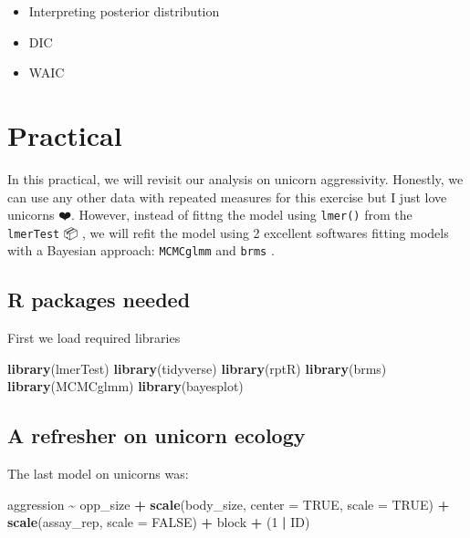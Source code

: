 \documentclass[
  12pt,
]{book}
\newenvironment{Shaded}{\begin{snugshade}}{\end{snugshade}}
\newcommand{\DataTypeTok}[1]{\textcolor[rgb]{0.13,0.29,0.53}{#1}}
\newcommand{\DecValTok}[1]{\textcolor[rgb]{0.00,0.00,0.81}{#1}}
\newcommand{\KeywordTok}[1]{\textcolor[rgb]{0.13,0.29,0.53}{\textbf{#1}}}
\newcommand{\NormalTok}[1]{#1}
\newcommand{\OperatorTok}[1]{\textcolor[rgb]{0.81,0.36,0.00}{\textbf{#1}}}
\newcommand{\OtherTok}[1]{\textcolor[rgb]{0.56,0.35,0.01}{#1}}
\newcommand{\StringTok}[1]{\textcolor[rgb]{0.31,0.60,0.02}{#1}}
\providecommand{\tightlist}{%
  \setlength{\itemsep}{0pt}\setlength{\parskip}{0pt}}
\begin{document}
\begin{itemize}
\tightlist
\item
  Interpreting posterior distribution
\item
  DIC
\item
  WAIC
\end{itemize}

\hypertarget{practical-4}{%
\section{Practical}\label{practical-4}}

In this practical, we will revisit our analysis on unicorn aggressivity.
Honestly, we can use any other data with repeated measures for this exercise
but I just love unicorns ❤️.
However, instead of fittng the model using \texttt{lmer()} from the \texttt{lmerTest}
📦 \citep{R-lmerTest}, we will refit the model using 2 excellent
softwares fitting models with a Bayesian approach: \texttt{MCMCglmm} \citep{MCMCglmm2010} and
\texttt{brms} \citep{R-brms}.

\hypertarget{r-packages-needed-1}{%
\subsection{R packages needed}\label{r-packages-needed-1}}

First we load required libraries

\begin{Shaded}
\begin{Highlighting}[]
\KeywordTok{library}\NormalTok{(lmerTest)}
\KeywordTok{library}\NormalTok{(tidyverse)}
\KeywordTok{library}\NormalTok{(rptR)}
\KeywordTok{library}\NormalTok{(brms)}
\KeywordTok{library}\NormalTok{(MCMCglmm)}
\KeywordTok{library}\NormalTok{(bayesplot)}
\end{Highlighting}
\end{Shaded}

\hypertarget{a-refresher-on-unicorn-ecology}{%
\subsection{A refresher on unicorn ecology}\label{a-refresher-on-unicorn-ecology}}

The last model on unicorns was:

\begin{Shaded}
\begin{Highlighting}[]
\NormalTok{aggression }\OperatorTok{\textasciitilde{}}\StringTok{ }\NormalTok{opp\_size }\OperatorTok{+}\StringTok{ }\KeywordTok{scale}\NormalTok{(body\_size, }\DataTypeTok{center =} \OtherTok{TRUE}\NormalTok{, }\DataTypeTok{scale =} \OtherTok{TRUE}\NormalTok{)}
              \OperatorTok{+}\StringTok{ }\KeywordTok{scale}\NormalTok{(assay\_rep, }\DataTypeTok{scale =} \OtherTok{FALSE}\NormalTok{) }\OperatorTok{+}\StringTok{ }\NormalTok{block}
              \OperatorTok{+}\StringTok{ }\NormalTok{(}\DecValTok{1} \OperatorTok{|}\StringTok{ }\NormalTok{ID)}
\end{Highlighting}
\end{Shaded}
\end{document}
